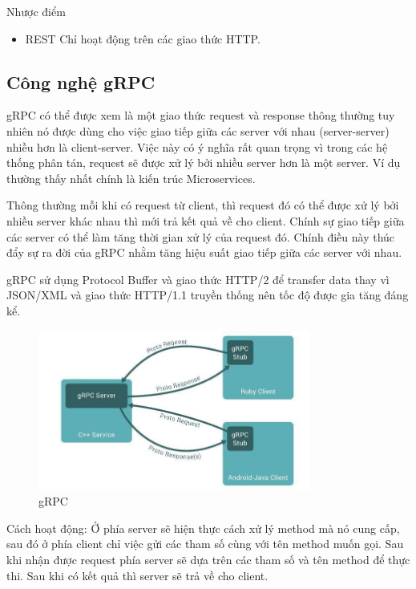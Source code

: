 \begin{itemize}
		    Nhược điểm
		    
	        \begin{itemize}
	            \item REST Chỉ hoạt động trên các giao thức HTTP.
	        \end{itemize}
	        \subsection{Công nghệ gRPC}
		    
		    gRPC có thể được xem là một giao thức request và response thông thường tuy nhiên nó được dùng cho việc giao tiếp giữa các server với nhau (server-server) nhiều hơn là client-server. Việc này có ý nghĩa rất quan trọng vì trong các hệ thống phân tán, request sẽ được xử lý bởi nhiều server hơn là một server. Ví dụ thường thấy nhất chính là kiến trúc Microservices.
		    
		    Thông thường mỗi khi có request từ client, thì request đó có thể được xử lý bởi nhiều server khác nhau thì mới trả kết quả về cho client. Chính sự giao tiếp giữa các server có thể làm tăng thời gian xử lý của request đó. Chính điều này thúc đẩy sự ra đời của gRPC nhằm tăng hiệu suất giao tiếp giữa các server với nhau.
		    
		    gRPC sử dụng Protocol Buffer và giao thức HTTP/2 để transfer data thay vì JSON/XML và giao thức HTTP/1.1 truyền thống nên tốc độ được gia tăng đáng kể.
		    \newpage
    	    \begin{figure}[!ht]   			\includegraphics[width=0.8\textwidth]{Images/gRPC.jpg}
    		\centering
    		\linebreak
    		\caption{gRPC}
	        \end{figure}
		    
		    Cách hoạt động: Ở phía server sẽ hiện thực cách xử lý method mà nó cung cấp, sau đó ở phía client chỉ việc gửi các tham số cùng với tên method muốn gọi. Sau khi nhận được request phía server sẽ dựa trên các tham số và tên method để thực thi. Sau khi có kết quả thì server sẽ trả về cho client.
		    

\end{itemize}
